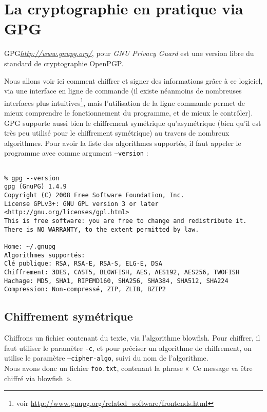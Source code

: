 \chapter{La cryptographie en pratique via GPG}
GPG\emph{\url{http://www.gnupg.org/}}, pour 
\emph{GNU Privacy Guard} est une version libre du
standard de cryptographie OpenPGP.


Nous allons voir ici comment chiffrer et signer des informations 
grâce à ce
logiciel, via une interface en ligne de commande (il existe
néanmoins de nombreuses interfaces plus intuitives\footnote{voir
\url{http://www.gnupg.org/related_software/frontends.html}}, mais
l'utilisation de la ligne commande permet de mieux comprendre le
fonctionnement du programme, et de mieux le contrôler).
\\

GPG supporte aussi bien le chiffrement symétrique qu'asymétrique
(bien qu'il est très peu utilisé pour le chiffrement symétrique)
au travers de nombreux algorithmes. Pour avoir la liste des
algorithmes supportés, il faut appeler le programme avec comme
argument \texttt{--version} : 

\lstset{language=bash}
\begin{lstlisting}

% gpg --version 
gpg (GnuPG) 1.4.9
Copyright (C) 2008 Free Software Foundation, Inc.
License GPLv3+: GNU GPL version 3 or later
<http://gnu.org/licenses/gpl.html>
This is free software: you are free to change and redistribute it.
There is NO WARRANTY, to the extent permitted by law.

Home: ~/.gnupg
Algorithmes supportés:
Clé publique: RSA, RSA-E, RSA-S, ELG-E, DSA
Chiffrement: 3DES, CAST5, BLOWFISH, AES, AES192, AES256, TWOFISH
Hachage: MD5, SHA1, RIPEMD160, SHA256, SHA384, SHA512, SHA224
Compression: Non-compressé, ZIP, ZLIB, BZIP2

\end{lstlisting}

\section{Chiffrement symétrique}
Chiffrons un fichier contenant du texte, via l'algorithme
blowfish. Pour chiffrer, il faut utiliser le paramètre
\texttt{-c}, et pour préciser un algorithme de chiffrement, on
utilise le paramètre \texttt{--cipher-algo}, suivi du nom de
l'algorithme.\\
Nous avons donc un fichier \texttt{foo.txt}, contenant la phrase
«~Ce message va être chiffré via blowfish~».


